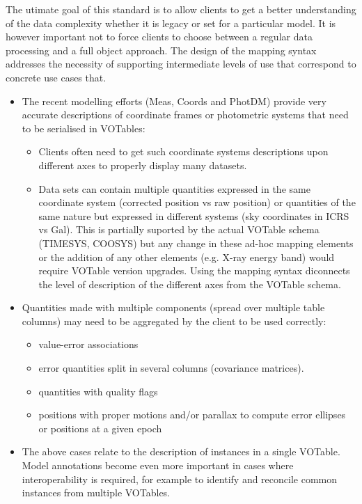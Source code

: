 
The utimate goal of this standard is to allow clients to get a better understanding of the data complexity whether it is legacy or set for a particular model. It is however important not to force clients to choose between a regular data processing and a full object approach.
The design of the mapping syntax addresses the necessity of supporting intermediate levels of use that correspond to concrete use cases that.

\begin{itemize}
  \item The recent modelling efforts (Meas, Coords and PhotDM) provide very accurate descriptions of coordinate frames or photometric 
        systems that need to be serialised in VOTables:
  \begin{itemize}
    \item Clients often need to get such coordinate systems descriptions upon different axes to properly display many datasets. 
    \item Data sets can contain multiple quantities expressed in the same coordinate system (corrected position vs raw position) or 
          quantities of the same nature but expressed in different systems (sky coordinates in ICRS vs Gal). 
          This is partially suported by the actual VOTable schema (TIMESYS, COOSYS) but any change in these ad-hoc mapping 
          elements or the addition of any other elements (e.g. X-ray energy band) would require VOTable version upgrades. 
          Using the mapping syntax diconnects the level of description of the different axes from the VOTable schema.           
  \end{itemize} 
  
  \item Quantities made with multiple components (spread over multiple table columns) may need to be aggregated by the client to be used correctly:
  \begin{itemize}
    \item value-error associations
    \item error quantities split in several columns (covariance matrices). 
    \item quantities with quality flags
    \item positions with proper motions and/or parallax to compute error ellipses or positions at a given epoch
  \end{itemize} 

  \item The above cases relate to the description of instances in a
  single VOTable. Model annotations become even more important in cases
  where interoperability is required, for example to identify and
  reconcile common instances from multiple VOTables.


\end{itemize}
